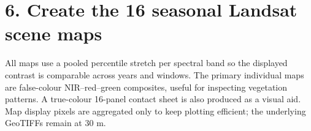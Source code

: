 \documentclass[
]{article}
\newenvironment{Shaded}{\begin{snugshade}}{\end{snugshade}}
\newcommand{\AttributeTok}[1]{\textcolor[rgb]{0.13,0.29,0.53}{#1}}
\newcommand{\FunctionTok}[1]{\textcolor[rgb]{0.13,0.29,0.53}{\textbf{#1}}}
\newcommand{\NormalTok}[1]{#1}
\newcommand{\OtherTok}[1]{\textcolor[rgb]{0.56,0.35,0.01}{#1}}
\newcommand{\SpecialCharTok}[1]{\textcolor[rgb]{0.81,0.36,0.00}{\textbf{#1}}}
\newcommand{\StringTok}[1]{\textcolor[rgb]{0.31,0.60,0.02}{#1}}
\begin{document}
\begin{Shaded}
\end{Shaded}

\section{6. Create the 16 seasonal Landsat scene
maps}\label{create-the-16-seasonal-landsat-scene-maps}

All maps use a pooled percentile stretch per spectral band so the
displayed contrast is comparable across years and windows. The primary
individual maps are false-colour NIR--red--green composites, useful for
inspecting vegetation patterns. A true-colour 16-panel contact sheet is
also produced as a visual aid. Map display pixels are aggregated only to
keep plotting efficient; the underlying GeoTIFFs remain at 30 m.
\end{document}
